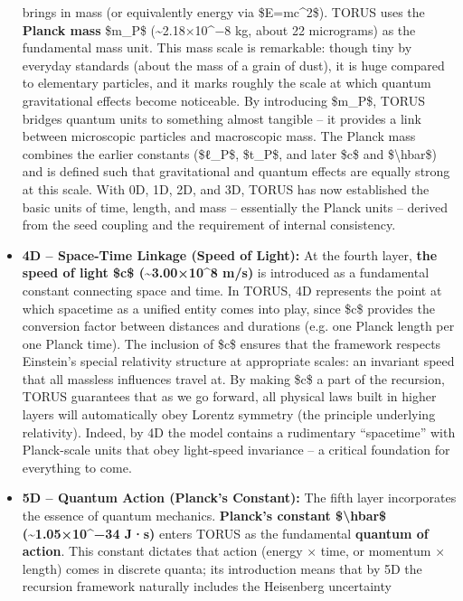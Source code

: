 \begin{itemize}
  brings in mass (or equivalently energy via \$E=mc\^{}2\$). TORUS uses
  the \textbf{Planck mass} \$m\_P\$ (\textasciitilde{}2.18×10\^{}−8 kg,
  about 22 micrograms) as the fundamental mass unit​. This mass scale is
  remarkable: though tiny by everyday standards (about the mass of a
  grain of dust), it is huge compared to elementary particles, and it
  marks roughly the scale at which quantum gravitational effects become
  noticeable. By introducing \$m\_P\$, TORUS bridges quantum units to
  something almost tangible -- it provides a link between microscopic
  particles and macroscopic mass. The Planck mass combines the earlier
  constants (\$ℓ\_P\$, \$t\_P\$, and later \$c\$ and
  \$\textbackslash{}hbar\$) and is defined such that gravitational and
  quantum effects are equally strong at this scale. With 0D, 1D, 2D, and
  3D, TORUS has now established the basic units of time, length, and
  mass -- essentially the Planck units -- derived from the seed coupling
  and the requirement of internal consistency.
\item
  \textbf{4D -- Space-Time Linkage (Speed of Light):} At the fourth
  layer, \textbf{the speed of light \$c\$ (\textasciitilde{}3.00×10\^{}8
  m/s)} is introduced as a fundamental constant connecting space and
  time​. In TORUS, 4D represents the point at which spacetime as a
  unified entity comes into play, since \$c\$ provides the conversion
  factor between distances and durations (e.g. one Planck length per one
  Planck time). The inclusion of \$c\$ ensures that the framework
  respects Einstein's special relativity structure at appropriate
  scales: an invariant speed that all massless influences travel at. By
  making \$c\$ a part of the recursion, TORUS guarantees that as we go
  forward, all physical laws built in higher layers will automatically
  obey Lorentz symmetry (the principle underlying relativity). Indeed,
  by 4D the model contains a rudimentary ``spacetime'' with Planck-scale
  units that obey light-speed invariance -- a critical foundation for
  everything to come.
\item
  \textbf{5D -- Quantum Action (Planck's Constant):} The fifth layer
  incorporates the essence of quantum mechanics. \textbf{Planck's
  constant \$\textbackslash{}hbar\$ (\textasciitilde{}1.05×10\^{}−34
  J·s)} enters TORUS as the fundamental \textbf{quantum of action}​.
  This constant dictates that action (energy × time, or momentum ×
  length) comes in discrete quanta; its introduction means that by 5D
  the recursion framework naturally includes the Heisenberg uncertainty

\end{itemize}
